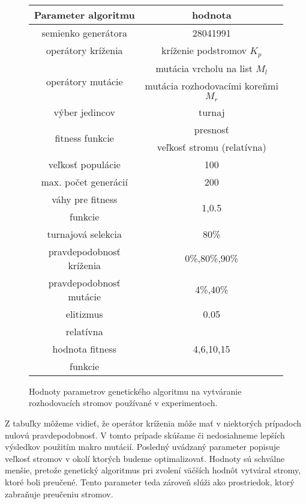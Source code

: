 \begin{figure}[h]
\centering
\begin{tabular}{|c c|}
\hline 
Parameter algoritmu & hodnota \\
\hline
semienko generátora & 28041991 \\
\hline
operátory kríženia & kríženie podstromov $K_p$\\
\hline
\multirow{2}{*}{operátory mutácie} & mutácia vrcholu na list $M_l$ \\
 & mutácia rozhodovacími koreňmi $M_r$\\
\hline
výber jedincov & turnaj \\
\hline
\multirow{2}{*}{fitness funkcie} & presnosť\\
 & veľkosť stromu (relatívna) \\
\hline
veľkosť populácie & 100 \\
\hline
max. počet generácií & 200 \\
\hline
váhy pre fitness & \multirow{2}{*}{1,0.5} \\
funkcie & \\
\hline
turnajová selekcia & 80\% \\
\hline
pravdepodobnosť kríženia & 0\%,80\%,90\%\\
\hline
pravdepodobnosť mutácie & 4\%,40\%\\
\hline
elitizmus & 0.05\\
\hline
relatívna & \multirow{3}{*}{4,6,10,15}\\
hodnota fitness & \\
funkcie & \\
\hline
\end{tabular}
\caption{Hodnoty parametrov genetického algoritmu na vytváranie rozhodovacích stromov používané v experimentoch.}\label{fig:configs}
\end{figure}

Z tabuľky môžeme vidieť, že operátor kríženia môže mať v niektorých prípadoch nulovú pravdepodobnosť. V tomto prípade skúšame či nedosiahneme lepších výsledkov použitím makro mutácií.
Posledný uvádzaný parameter popisuje veľkosť stromov v okolí ktorých budeme optimalizovať. Hodnoty sú schválne menšie, pretože genetický algoritmus pri zvolení väčších hodnôt vytváral stromy, ktoré boli preučené. Tento parameter teda zároveň slúži ako prostriedok, ktorý zabraňuje preučeniu stromov. 

